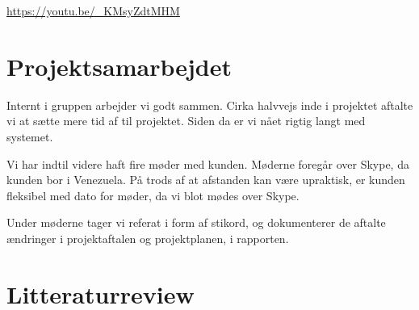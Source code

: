 \documentclass[12pt,a4paper]{article}
\begin{document}
\url{https://youtu.be/_KMsyZdtMHM}

\section{Projektsamarbejdet}
Internt i gruppen arbejder vi godt sammen. Cirka halvvejs inde i projektet aftalte vi at sætte mere tid af til projektet. Siden da er vi nået rigtig langt med systemet. 

Vi har indtil videre haft fire møder med kunden. Møderne foregår over Skype, da kunden bor i Venezuela. På trods af at afstanden kan være upraktisk, er kunden fleksibel med dato for møder, da vi blot mødes over Skype.

Under møderne tager vi referat i form af stikord, og dokumenterer de aftalte ændringer i projektaftalen og projektplanen, i rapporten. 
\section{Litteraturreview}
\end{document}
